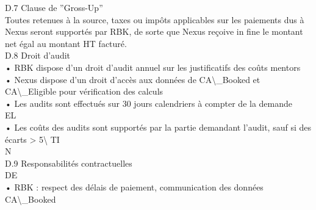 \vspace{0.5em}
\vspace{0.5em}
D.7 Clause de ”Gross-Up”\\
Toutes retenues à la source, taxes ou impôts applicables sur les paiements dus à Nexus seront supportés par RBK, de sorte que Nexus reçoive in fine le montant\\
net égal au montant HT facturé.\\
\vspace{0.5em}
\vspace{0.5em}
\vspace{0.5em}
D.8 Droit d’audit\\
• RBK dispose d’un droit d’audit annuel sur les justificatifs des coûts mentors\\
\vspace{0.5em}
• Nexus dispose d’un droit d’accès aux données de CA\textbackslash{}_Booked et CA\textbackslash{}_Eligible pour vérification des calculs\\
\vspace{0.5em}
• Les audits sont effectués sur 30 jours calendriers à compter de la demande\\
\vspace{0.5em}
\vspace{0.5em}
\vspace{0.5em}
\vspace{0.5em}
EL\\
• Les coûts des audits sont supportés par la partie demandant l’audit, sauf si des écarts \textgreater{} 5\textbackslash{}%
\vspace{0.5em}
\vspace{0.5em}
\vspace{0.5em}
\vspace{0.5em}
TI\\
N\\
D.9 Responsabilités contractuelles\\
\vspace{0.5em}
\vspace{0.5em}
\vspace{0.5em}
\vspace{0.5em}
DE\\
• RBK : respect des délais de paiement, communication des données CA\textbackslash{}_Booked\\
\vspace{0.5em}
\vspace{0.5em}
\vspace{0.5em}
